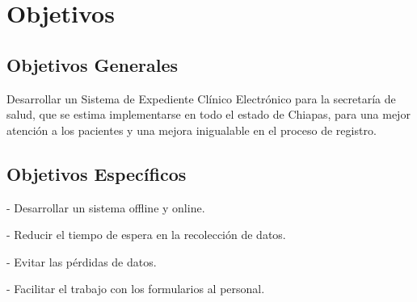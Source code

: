 \section{Objetivos}

    \subsection{Objetivos Generales}
    \label{subsec:objGrales}
  Desarrollar un Sistema de Expediente Clínico Electrónico para la secretaría de salud, que se estima implementarse en todo el estado de Chiapas, para una mejor atención a los pacientes y una mejora inigualable en el proceso de registro.

    \subsection{Objetivos Específicos}

    - Desarrollar un sistema offline y online.

    - Reducir el tiempo de espera en la recolección de datos.

    - Evitar las pérdidas de datos.
    
    - Facilitar el trabajo con los formularios al personal.
